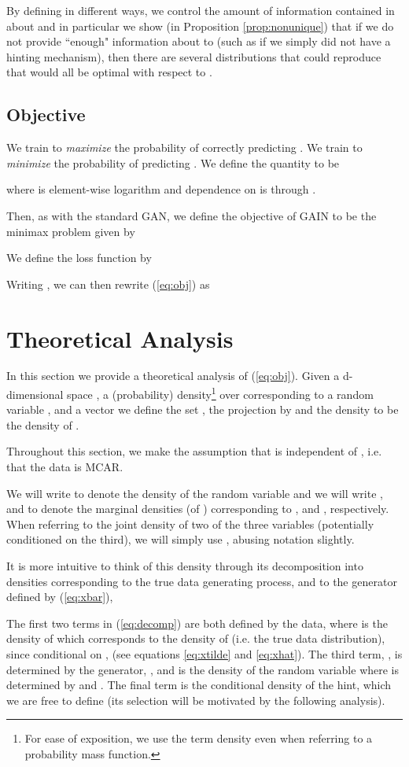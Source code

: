\documentclass{article}
\begin{document}
By defining  in different ways, we control the amount of information contained in  about  and in particular we show (in Proposition \ref{prop:nonunique}) that if we do not provide ``enough" information about  to  (such as if we simply did not have a hinting mechanism), then there are several distributions that  could reproduce that would all be optimal with respect to .

\subsection{Objective}
We train  to {\em maximize} the probability of correctly predicting . We train  to {\em minimize} the probability of  predicting . We define the quantity  to be


where  is element-wise logarithm and dependence on  is through .

Then, as with the standard GAN, we define the objective of GAIN to be the minimax problem given by


We define the loss function  by

Writing , we can then rewrite (\ref{eq:obj}) as


\section{Theoretical Analysis} \label{sec:theory}
In this section we provide a theoretical analysis of (\ref{eq:obj}). Given a d-dimensional space , a (probability) density\footnote{For ease of exposition, we use the term density even when referring to a probability mass function.}  over  corresponding to a random variable , and a vector  we define the set , the projection  by  and the density  to be the density of .

Throughout this section, we make the assumption that  is independent of , i.e. that the data is MCAR.

We will write  to denote the density of the random variable  and we will write ,  and  to denote the marginal densities (of ) corresponding to ,  and , respectively. When referring to the joint density of two of the three variables (potentially conditioned on the third), we will simply use , abusing notation slightly.

It is more intuitive to think of this density through its decomposition into densities corresponding to the true data generating process, and to the generator defined by (\ref{eq:xbar}),

The first two terms in (\ref{eq:decomp}) are both defined by the data, where  is the density of  which corresponds to the density of  (i.e. the true data distribution), since conditional on ,  (see equations \ref{eq:xtilde} and \ref{eq:xhat}). The third term, , is determined by the generator, , and is the density of the random variable  where  is determined by  and . The final term is the conditional density of the hint, which we are free to define (its selection will be motivated by the following analysis).
\end{document}
